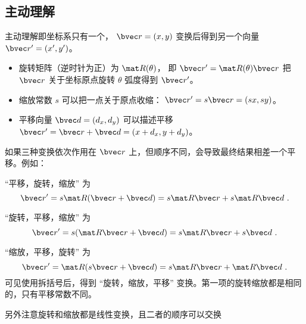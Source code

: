 

\subsection{主动理解}
主动理解即坐标系只有一个， $\bvec r = (x, y)$ 变换后得到另一个向量 $\bvec r' = (x',y')$。

\begin{itemize}
\item 旋转矩阵（逆时针为正）为 $\mat R(\theta)$， 即 $\bvec r' = \mat R(\theta)\bvec r$ 把 $\bvec r$ 关于坐标原点旋转 $\theta$ 弧度得到 $\bvec r'$。
\item 缩放常数 $s$ 可以把一点关于原点收缩： $\bvec r' = s\bvec r = (sx, sy)$。
\item 平移向量 $\bvec d = (d_x,d_y)$ 可以描述平移 $\bvec r' = \bvec r + \bvec d = (x+d_x,y+d_y)$。
\end{itemize}

如果三种变换依次作用在 $\bvec r$ 上，但顺序不同，会导致最终结果相差一个平移。例如：

“平移，旋转，缩放” 为
\begin{equation}
\bvec r' = s\mat R (\bvec r + \bvec d) = s\mat R\bvec r + s\mat R\bvec d~.
\end{equation}

“旋转，平移，缩放” 为
\begin{equation}
\bvec r' = s(\mat R\bvec r + \bvec d) = s\mat R\bvec r + s\bvec d~.
\end{equation}

“缩放，平移，旋转” 为
\begin{equation}
\bvec r' = \mat R(s\bvec r + \bvec d) = s\mat R\bvec r + \mat R\bvec d~.
\end{equation}
可见使用拆括号后，得到 “旋转，缩放，平移” 变换。第一项的旋转缩放都是相同的，只有平移常数不同。

另外注意旋转和缩放都是线性变换，且二者的顺序可以交换